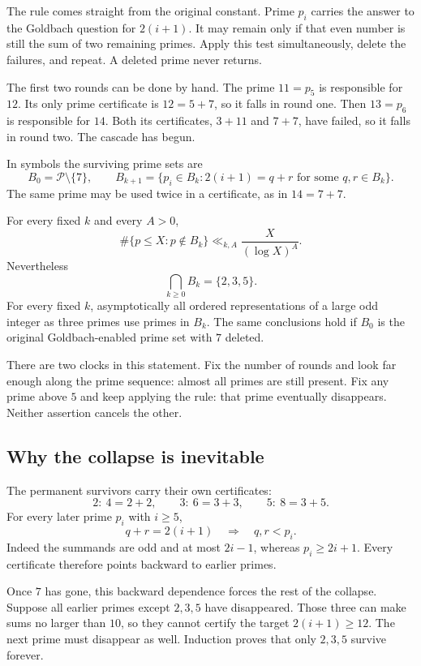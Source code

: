 The rule comes straight from the original constant.
Prime $p_i$ carries the answer to the Goldbach question for $2(i+1)$.
It may remain only if that even number is still the sum of two
remaining primes.  Apply this test simultaneously, delete the failures,
and repeat.  A deleted prime never returns.

The first two rounds can be done by hand.
The prime $11=p_5$ is responsible for $12$.
Its only prime certificate is $12=5+7$, so it falls in round one.
Then $13=p_6$ is responsible for $14$.
Both its certificates, $3+11$ and $7+7$, have failed, so it falls in
round two.  The cascade has begun.

In symbols the surviving prime sets are
\begin{equation}\label{fin:pruning}
 B_0=\mathcal P\setminus\{7\},\qquad
 B_{k+1}=\{p_i\in B_k:2(i+1)=q+r
                    \text{ for some }q,r\in B_k\}.
\end{equation}
The same prime may be used twice in a certificate, as in $14=7+7$.
\begin{theorem}\label{fin:delete}
For every fixed $k$ and every $A>0$,
\[
 \#\{p\le X:p\notin B_k\}\ll_{k,A}\frac X{(\log X)^A}.
\]
Nevertheless
\[
 \boxed{\bigcap_{k\ge0}B_k=\{2,3,5\}.}
\]
For every fixed $k$, asymptotically all ordered representations of a
large odd integer as three primes use primes in $B_k$.
The same conclusions hold if $B_0$ is the original Goldbach-enabled
prime set with $7$ deleted.
\end{theorem}

There are two clocks in this statement.
Fix the number of rounds and look far enough along the prime sequence:
almost all primes are still present.
Fix any prime above $5$ and keep applying the rule:
that prime eventually disappears.
Neither assertion cancels the other.

\subsection{Why the collapse is inevitable}
The permanent survivors carry their own certificates:
\[
 2:\ 4=2+2,\qquad
 3:\ 6=3+3,\qquad
 5:\ 8=3+5.
\]
For every later prime $p_i$ with $i\ge5$,
\[
 q+r=2(i+1)\quad\Longrightarrow\quad q,r<p_i.
\]
Indeed the summands are odd and at most $2i-1$, whereas
$p_i\ge2i+1$.  Every certificate therefore points backward to earlier
primes.

Once $7$ has gone, this backward dependence forces the rest of the
collapse.  Suppose all earlier primes except $2,3,5$ have disappeared.
Those three can make sums no larger than $10$, so they cannot certify
the target $2(i+1)\ge12$.  The next prime must disappear as well.
Induction proves that only $2,3,5$ survive forever.

